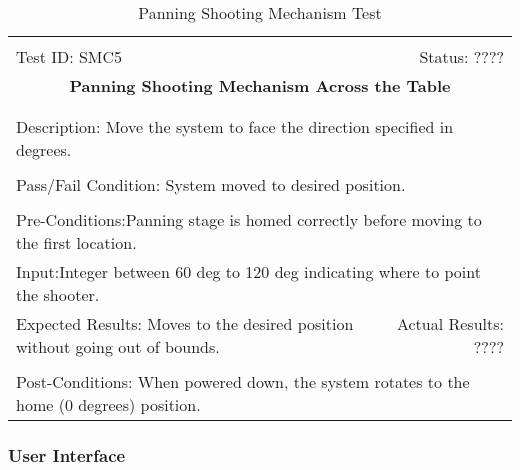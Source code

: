 \documentclass[11pt]{article}
\begin{document}
\begin{center}
\begin{table}[H]
\begin{tabular}{|l r|}\hline&\\[-2mm]
	Test ID: SMC5	&Status: ????\\[-3mm]
	\multicolumn{2}{|c|}{\textbf{\large{Panning Shooting Mechanism Across the Table}}}\\&\\\hline&\\[-3mm]
	\multicolumn{2}{|p{\textwidth}|}{Description: Move the system to face the direction specified in degrees.}\\[1mm]\hline&\\[-3mm]
	\multicolumn{2}{|p{\textwidth}|}{Pass/Fail Condition: System moved to desired position.}\\[1mm]\hline&\\[-3mm]
	\multicolumn{2}{|p{\textwidth}|}{Pre-Conditions:Panning stage is homed correctly before moving to the first location.}\\[4mm]
	\multicolumn{2}{|p{\textwidth}|}{Input:Integer between 60 deg to 120 deg indicating where to point the shooter.}\\[2mm]\hline
	\multicolumn{1}{|p{0.49\textwidth}}{Expected Results: Moves to the desired position without going out of bounds.
}	&\multicolumn{1}{|p{0.45\textwidth}|}{Actual Results: ????}\\\hline&\\[-3mm]
	\multicolumn{2}{|p{\textwidth}|}{Post-Conditions: When powered down, the system rotates to the home (0 degrees) position.}\\\hline
\end{tabular}
\caption{Panning Shooting Mechanism Test}
\end{table}
\end{center}

\subsubsection{User Interface} %
\end{document}
